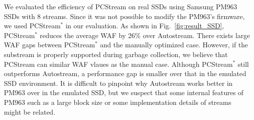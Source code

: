 We evaluated the efficiency of {\sf PCStream} on real SSDs using Samsung PM963 SSDs with 8 streams.  
Since it was not possible to modify the PM963's firmware, 
we used {\sf PCStream}$^{*}$ in our evaluation.
As shown in Fig.~\ref{fig:result_SSD}, 
{\sf PCStream}$^{*}$ reduces the average WAF by 26\% over {\sf Autostream}. 
There exists large WAF gaps between {\sf PCStream}$^{*}$ and the manually optimized case. 
However, if the substream is properly supported during garbage collection, 
we believe that {\sf PCStream} can similar WAF vlaues as the {\sf manual} case. 
Although {\sf PCStream}$^{*}$ still outperforms {\sf Autostream}, 
a performance gap is smaller over that in the emulated SSD environment. 
It is difficult to pinpoint why {\sf Autostream} works better in PM963 over in the emulated SSD, 
but we suspect that some internal features of PM963 such as a large block size or some implementation details of streams might be related. 

